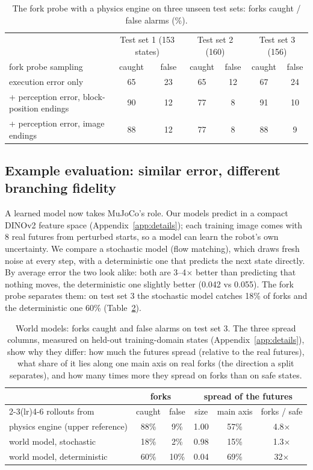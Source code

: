 \documentclass{article}
\begin{document}
\begin{table}[t]
\centering
\caption{The fork probe with a physics engine on three unseen test sets: forks caught / false alarms (\%).}
\label{tab:panels}
\small
\begin{tabular}{lcccccc}
\toprule
& \multicolumn{2}{c}{Test set 1 (153 states)} & \multicolumn{2}{c}{Test set 2 (160)} & \multicolumn{2}{c}{Test set 3 (156)} \\
fork probe sampling & caught & false & caught & false & caught & false \\
\midrule
execution error only & 65 & 23 & 65 & 12 & 67 & 24 \\
+ perception error, block-position endings & 90 & 12 & 77 & 8 & 91 & 10 \\
+ perception error, image endings & 88 & 12 & 77 & 8 & 88 & 9 \\
\bottomrule
\end{tabular}
\end{table}

\subsection{Example evaluation: similar error, different branching fidelity}\label{sec:wm}
A learned model now takes MuJoCo's role. Our models predict in a compact DINOv2 feature space
\citep{oquab2024dinov2} (Appendix~\ref{app:details}); each training image comes with 8 real futures from
perturbed starts, so a model can learn the robot's own uncertainty. We compare a stochastic model (flow
matching), which draws fresh noise at every step, with a deterministic one that predicts the next state
directly. By average error the two look alike: both are 3--4$\times$ better than predicting that nothing
moves, the deterministic one slightly better (0.042 vs 0.055). The fork probe separates them: on test set 3
the stochastic model catches 18\% of forks and the deterministic one 60\% (Table~\ref{tab:wm}).

\begin{table}[t]
\centering
\caption{World models: forks caught and false alarms on test set 3. The three spread columns, measured on
held-out training-domain states (Appendix~\ref{app:details}), show why they differ: how much the futures
spread (relative to the real futures), what share of it lies along one main axis on real forks (the
direction a split separates), and how many times more they spread on forks than on safe states.}
\label{tab:wm}
\small
\begin{tabular}{lccccc}
\toprule
& \multicolumn{2}{c}{forks} & \multicolumn{3}{c}{spread of the futures} \\
\cmidrule(lr){2-3}\cmidrule(lr){4-6}
rollouts from & caught & false & size & main axis & forks / safe \\
\midrule
physics engine (upper reference) & 88\% & 9\% & 1.00 & 57\% & 4.8$\times$ \\
world model, stochastic & 18\% & 2\% & 0.98 & 15\% & 1.3$\times$ \\
world model, deterministic & 60\% & 10\% & 0.04 & 69\% & 32$\times$ \\
\bottomrule
\end{tabular}
\end{table}
\end{document}
